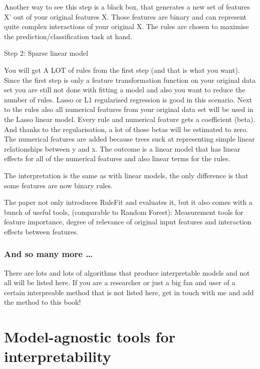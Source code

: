 \documentclass[12pt,]{krantz}
\theoremstyle{definition}
\theoremstyle{definition}
\theoremstyle{definition}
\theoremstyle{remark}
\begin{document}
Another way to see this step is a black box, that generates a new set of
features X' out of your original features X. Those features are binary
and can represent quite complex interactions of your original X. The
rules are chosen to maximise the prediction/classification task at hand.

Step 2: Sparse linear model

You will get A LOT of rules from the first step (and that is what you
want). Since the first step is only a feature transformation function on
your original data set you are still not done with fitting a model and
also you want to reduce the number of rules. Lasso or L1 regularised
regression is good in this scenario. Next to the rules also all
numerical features from your original data set will be used in the Lasso
linear model. Every rule and numerical feature gets a coefficient
(beta). And thanks to the regularisation, a lot of those betas will be
estimated to zero. The numerical features are added because trees suck
at representing simple linear relationships between y and x. The outcome
is a linear model that has linear effects for all of the numerical
features and also linear terms for the rules.

The interpretation is the same as with linear models, the only
difference is that some features are now binary rules.

The paper not only introduces RuleFit and evaluates it, but it also
comes with a bunch of useful tools, (comparable to Random Forest):
Measurement tools for feature importance, degree of relevance of
original input features and interaction effects between features.

\subsection{And so many more \ldots{}}\label{and-so-many-more}

There are lots and lots of algorithms that produce interpretable models
and not all will be listed here. If you are a researcher or just a big
fan and user of a certain interpreable method that is not listed here,
get in touch with me and add the method to this book!

\chapter{Model-agnostic tools for interpretability}\label{agnostic}
\end{document}
